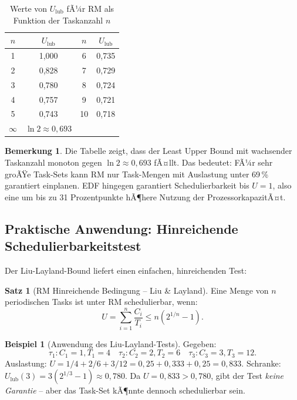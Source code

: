 ﻿\documentclass[a4paper,12pt]{report}
\theoremstyle{definition}
\newtheorem{beispiel}{Beispiel}[chapter]
\newtheorem{satz}{Satz}[chapter]
\newtheorem{bemerkung}{Bemerkung}[chapter]
\begin{document}
\begin{table}[H]
	\centering
	\caption{Werte von $U_{\text{lub}}$ fÃ¼r RM als Funktion der Taskanzahl $n$}
	\label{tab:rm_lub}
	\begin{tabular}{cc|cc}
		\toprule
		$n$ & $U_{\text{lub}}$ & $n$ & $U_{\text{lub}}$ \\
		\midrule
		1   & 1{,}000          & 6   & 0{,}735          \\
		2   & 0{,}828          & 7   & 0{,}729          \\
		3   & 0{,}780          & 8   & 0{,}724          \\
		4   & 0{,}757          & 9   & 0{,}721          \\
		5   & 0{,}743          & 10  & 0{,}718          \\
		$\infty$ & $\ln 2 \approx 0{,}693$ & & \\
		\bottomrule
	\end{tabular}
\end{table}

\begin{bemerkung}
	Die Tabelle zeigt, dass der Least Upper Bound mit wachsender Taskanzahl
	monoton gegen $\ln 2 \approx 0{,}693$ fÃ¤llt. Das bedeutet: FÃ¼r sehr groÃŸe
	Task-Sets kann RM nur Task-Mengen mit Auslastung unter 69\,\% garantiert
	einplanen. EDF hingegen garantiert Schedulierbarkeit bis $U = 1$, also eine
	um bis zu 31 Prozentpunkte hÃ¶here Nutzung der ProzessorkapazitÃ¤t.
\end{bemerkung}

\subsection{Praktische Anwendung: Hinreichende Schedulierbarkeitstest}

Der Liu-Layland-Bound liefert einen einfachen, hinreichenden Test:

\begin{satz}[RM Hinreichende Bedingung -- Liu \& Layland]
	\label{satz:rm_suf}
	Eine Menge von $n$ periodischen Tasks ist unter RM schedulierbar, wenn:
	\[
		U = \sum_{i=1}^{n} \frac{C_i}{T_i} \leq n(2^{1/n} - 1).
	\]
\end{satz}

\begin{beispiel}[Anwendung des Liu-Layland-Tests]
	Gegeben:
	\[
		\tau_1: C_1=1, T_1=4 \quad \tau_2: C_2=2, T_2=6 \quad \tau_3: C_3=3, T_3=12.
	\]
	Auslastung: $U = 1/4 + 2/6 + 3/12 = 0{,}25 + 0{,}333 + 0{,}25 = 0{,}833$.
	Schranke: $U_{\text{lub}}(3) = 3(2^{1/3}-1) \approx 0{,}780$.
	Da $U = 0{,}833 > 0{,}780$, gibt der Test \emph{keine Garantie} -- aber das
	Task-Set kÃ¶nnte dennoch schedulierbar sein.
\end{beispiel}
\end{document}
